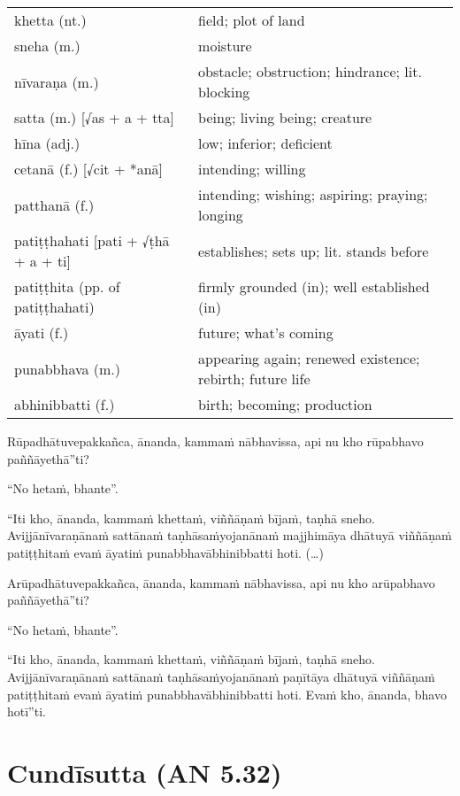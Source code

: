 \documentclass[11pt,oneside]{memoir}
\begin{document}
\begin{longtable}{L{\colOne} L{\colTwo}}
khetta (nt.) & field; plot of land\\[0pt]
sneha (m.) & moisture\\[0pt]
nīvaraṇa (m.) & obstacle; obstruction; hindrance; lit. blocking\\[0pt]
satta (m.) [√as + a + tta] & being; living being; creature\\[0pt]
hīna (adj.) & low; inferior; deficient\\[0pt]
cetanā (f.) [√cit + *anā] & intending; willing\\[0pt]
patthanā (f.) & intending; wishing; aspiring; praying; longing\\[0pt]
patiṭṭhahati [pati + √ṭhā + a + ti] & establishes; sets up; lit. stands before\\[0pt]
patiṭṭhita (pp. of patiṭṭhahati) & firmly grounded (in); well established (in)\\[0pt]
āyati (f.) & future; what's coming\\[0pt]
punabbhava (m.) & appearing again; renewed existence; rebirth; future life\\[0pt]
abhinibbatti (f.) & birth; becoming; production\\[0pt]
\end{longtable}

\begin{spacedquote}
Rūpadhātuvepakkañca, ānanda, kammaṁ nābhavissa, api nu kho rūpabhavo
paññāyethā”ti?

“No hetaṁ, bhante”.

“Iti kho, ānanda, kammaṁ khettaṁ, viññāṇaṁ bījaṁ, taṇhā sneho. Avijjānīvaraṇānaṁ
sattānaṁ taṇhāsaṁyojanānaṁ majjhimāya dhātuyā viññāṇaṁ patiṭṭhitaṁ evaṁ āyatiṁ
punabbhavābhinibbatti hoti. (…)

Arūpadhātuvepakkañca, ānanda, kammaṁ nābhavissa, api nu kho arūpabhavo
paññāyethā”ti?

“No hetaṁ, bhante”.

“Iti kho, ānanda, kammaṁ khettaṁ, viññāṇaṁ bījaṁ, taṇhā sneho. Avijjānīvaraṇānaṁ
sattānaṁ taṇhāsaṁyojanānaṁ paṇītāya dhātuyā viññāṇaṁ patiṭṭhitaṁ evaṁ āyatiṁ
punabbhavābhinibbatti hoti. Evaṁ kho, ānanda, bhavo hotī”ti.
\end{spacedquote}

\chapter{Cundīsutta (AN 5.32)}
\label{sec:org8494fde}
\end{document}
